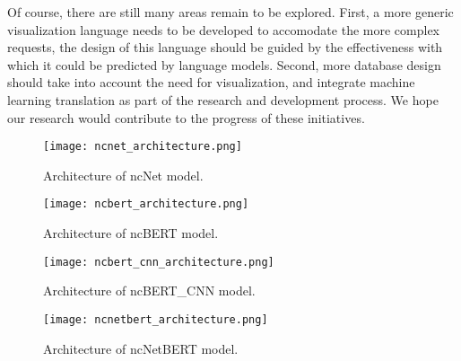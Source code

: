 \documentclass[
	a4paper, %
	10pt, %
	unnumberedsections, %
	twoside, %
]{t0003}
\begin{document}
Of course, there are still many areas remain to be explored. First, a more generic visualization language needs to be developed to accomodate the more complex requests, the design of this language should be guided by the effectiveness with which it could be predicted by language models. Second, more database design should take into account the need for visualization, and integrate machine learning translation as part of the research and development process. We hope our research would contribute to the progress of these initiatives.






\begin{figure*}
	\texttt{[image: ncnet\_architecture.png]}
	\caption{Architecture of ncNet model.}
	\label{fig:ncnet}
\end{figure*}


\begin{figure*}
	\texttt{[image: ncbert\_architecture.png]}
	\caption{Architecture of ncBERT model.}
	\label{fig:ncbert}
\end{figure*}

\begin{figure*}
	\texttt{[image: ncbert\_cnn\_architecture.png]}
	\caption{Architecture of ncBERT\_CNN model.}
	\label{fig:ncbertcnn}
\end{figure*}

\begin{figure*}
	\texttt{[image: ncnetbert\_architecture.png]}
	\caption{Architecture of ncNetBERT model.}
	\label{fig:ncnetbert}
\end{figure*}
\end{document}

